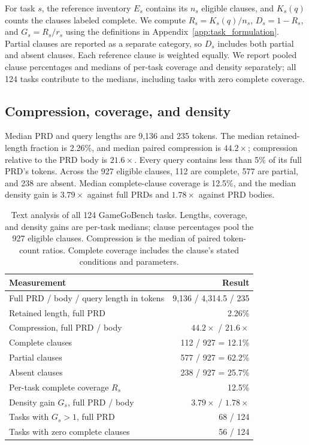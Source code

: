 \documentclass{article}
\begin{document}
For task $s$, the reference inventory $E_s$ contains its $n_s$ eligible clauses, and $K_s(q)$ counts the clauses labeled complete. We compute $R_s=K_s(q)/n_s$, $D_s=1-R_s$, and $G_s=R_s/r_s$ using the definitions in Appendix~\ref{app:task_formulation}. Partial clauses are reported as a separate category, so $D_s$ includes both partial and absent clauses. Each reference clause is weighted equally. We report pooled clause percentages and medians of per-task coverage and density separately; all 124 tasks contribute to the medians, including tasks with zero complete coverage.

\subsection{Compression, coverage, and density}

Median PRD and query lengths are 9{,}136 and 235 tokens. The median retained-length fraction is 2.26\%, and median paired compression is $44.2\times$; compression relative to the PRD body is $21.6\times$. Every query contains less than 5\% of its full PRD's tokens. Across the 927 eligible clauses, 112 are complete, 577 are partial, and 238 are absent. Median complete-clause coverage is 12.5\%, and the median density gain is $3.79\times$ against full PRDs and $1.78\times$ against PRD bodies.

\begin{table}[t]
\centering
\caption{Text analysis of all 124 GameGoBench tasks. Lengths, coverage, and density gains are per-task medians; clause percentages pool the 927 eligible clauses. Compression is the median of paired token-count ratios. Complete coverage includes the clause's stated conditions and parameters.}
\label{tab:bench_text_audit}
\small
\begin{tabular}{@{}lr@{}}
\toprule
Measurement & Result \\
\midrule
Full PRD / body / query length in tokens & 9,136 / 4,314.5 / 235 \\
Retained length, full PRD & 2.26\% \\
Compression, full PRD / body & $44.2\times$ / $21.6\times$ \\
\midrule
Complete clauses & 112 / 927 = 12.1\% \\
Partial clauses & 577 / 927 = 62.2\% \\
Absent clauses & 238 / 927 = 25.7\% \\
Per-task complete coverage $R_s$ & 12.5\% \\
Density gain $G_s$, full PRD / body & $3.79\times$ / $1.78\times$ \\
Tasks with $G_s>1$, full PRD & 68 / 124 \\
Tasks with zero complete clauses & 56 / 124 \\
\bottomrule
\end{tabular}
\end{table}
\end{document}
